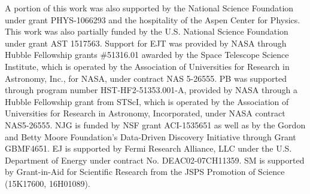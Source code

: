 \documentclass[twocolumn, tighten]{aastex6}
\begin{document}
A portion of this work was also supported by the National Science Foundation under grant PHYS-1066293 and the hospitality of the Aspen Center for Physics. This work was also partially funded by the U.S. National Science Foundation under grant AST 1517563. Support for EJT was provided by NASA through Hubble Fellowship grants \#51316.01 awarded by the Space Telescope Science Institute, which is operated by the Association of Universities for Research in Astronomy, Inc., for NASA, under contract NAS 5-26555.  PB was supported through program number HST-HF2-51353.001-A, provided by NASA through a Hubble Fellowship grant from STScI, which is operated by the Association of Universities for Research in Astronomy, Incorporated, under NASA contract NAS5-26555. NJG is funded by NSF grant ACI-1535651 as well as by the Gordon and Betty Moore Foundation's Data-Driven Discovery Initiative through Grant GBMF4651. EJ is supported by Fermi Research Alliance, LLC under the U.S. Department of Energy under contract No. DEAC02-07CH11359. SM is supported by Grant-in-Aid for Scientific Research from the JSPS Promotion of Science (15K17600, 16H01089).












\end{document}
